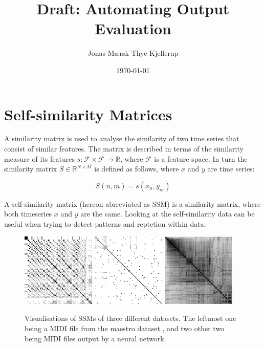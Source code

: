 \documentclass[a4paper]{article}
\title{Draft: Automating Output Evaluation}
\author{Jonas Mærsk Thye Kjellerup}
\date{\today}
\begin{document}
\maketitle
\newpage

%
%

\section{Self-similarity Matrices}\label{sec:theory-ssm}
A similarity matrix is used to analyse the similarity of two time series that consist of similar features. The matrix is described in terms of the similarity measure of its features $s : \mathcal{F} \times \mathcal{F} \rightarrow \mathbb{R}$, where $\mathcal{F}$ is a feature space. In turn the similarity matrix $S \in \mathbb{R}^{N \times M}$ is defined as follows, where $x$ and $y$ are time series:

\[ S(n,m)=s(x_n,y_m) \]

A self-similarity matrix (hereon abrreviated as SSM) is a similarity matrix, where both timeseries $x$ and $y$ are the same. Looking at the self-similarity data can be useful when trying to detect patterns and reptetion within data.

\begin{figure}[h]
    \center
    \includegraphics[width=3.5cm]{train_03.png}
    \includegraphics[width=3.5cm]{model_out_1.png}
    \includegraphics[width=3.5cm]{model_out_2.png}
    \caption{
        Visualisations of SSMs of three different datasets. The leftmost one being a MIDI file from the maestro dataset \cite{maestro}, and two other two being MIDI files output by a neural network.
    }
    \label{fig:ssm-comp}
\end{figure}
\end{document}
